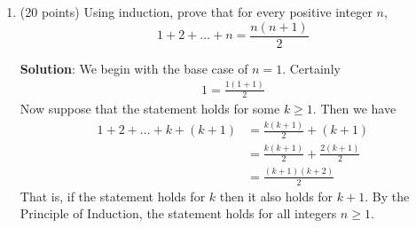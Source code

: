 \documentclass[12pt]{article}
\newenvironment{solution}{
\begin{mdframed}
  { {\bfseries Solution}: }}{
\end{mdframed}}
\begin{document}
\begin{enumerate}
\begin{solution}
\begin{enumerate}[label=({\alph*})]
\begin{figure}[H]

        \end{figure}
        Certainly for any odd cycle \textbf{C} larger than 3 we have \(\chi(\textbf{C}) = 3\) but \(\omega(\textbf{C}) = 2\).
        Therefore, \textbf{G} is not perfect because it contains an induced subgraph whose chromatic number is not equal to its maximum clique size.
      \end{enumerate}
    \end{solution}

    \pagebreak

    \item (20 points) Using induction, prove that for every positive integer \(n\),
    \begin{equation*}
      1 + 2 + \ldots + n = \frac{n (n+1)}{2}
    \end{equation*}

    \begin{solution}
      We begin with the base case of \(n = 1\). Certainly
      \begin{align*}
        1 = \frac{1 (1 + 1)}{2}
      \end{align*}
      Now suppose that the statement holds for some \(k \geq 1\). Then we have
      \begin{align*}
        1 + 2 + \ldots + k + (k + 1) &= \frac{k (k + 1)}{2} + (k + 1) \\
        &= \frac{k (k + 1)}{2} + \frac{2 (k + 1)}{2} \\
        &= \frac{(k + 1) (k + 2)}{2}
      \end{align*}
      That is, if the statement holds for \(k\) then it also holds for \(k + 1\).
      By the Principle of Induction, the statement holds for all integers \(n \geq 1\).
    \end{solution}


\end{enumerate}
\end{document}
